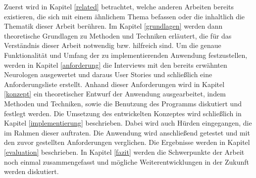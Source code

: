 Zuerst wird in Kapitel \ref{related} betrachtet, welche anderen Arbeiten bereits existieren, die sich mit einem ähnlichem Thema befassen oder die inhaltlich die Thematik dieser Arbeit berühren. 
Im Kapitel \ref{grundlagen} werden dann theoretische Grundlagen zu Methoden und Techniken erläutert, die für das Verständnis dieser Arbeit notwendig bzw. hilfreich sind.
Um die genaue Funktionalität und Umfang der zu implementierenden Anwendung festzustellen, werden in Kapitel \ref{anforderung} die Interviews mit den bereits erwähnten Neurologen ausgewertet und daraus User Stories und schließlich eine Anforderungsliste erstellt.
Anhand dieser Anforderungen wird in Kapitel \ref{konzept} ein theoretischer Entwurf der Anwendung ausgearbeitet, indem Methoden und Techniken, sowie die Benutzung des Programms diskutiert und festlegt werden.
Die Umsetzung des entwickelten Konzeptes wird schließlich in Kapitel \ref{implementierung} beschrieben. Dabei wird auch Hürden eingegangen, die im Rahmen dieser auftraten.
Die Anwendung wird anschließend getestet und mit den zuvor gestellten Anforderungen verglichen. Die Ergebnisse werden in Kapitel \ref{evaluation} beschrieben. 
In Kapitel \ref{fazit} werden die Schwerpunkte der Arbeit noch einmal zusammengefasst und mögliche Weiterentwicklungen in der Zukunft werden diskutiert. 
 